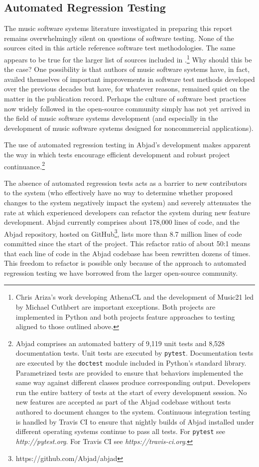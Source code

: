 \documentclass{article}
\begin{document}
\subsection{Automated Regression Testing}

The music software systems literature investigated in preparing this report
remains overwhelmingly silent on questions of software testing. None of the
sources cited in this article reference software test methodologies. The same
appears to be true for the larger list of sources included in
\cite{trevino2013compositional}.\footnote{Chris Ariza's work developing
AthenaCL \cite{Ariza2005} and the development of Music21 \cite{Ariza2010} led
by Michael Cuthbert are important exceptions. Both projects are implemented in
Python and both projects feature approaches to testing aligned to those
outlined above.} Why should this be the case? One possibility is that authors
of music software systems have, in fact, availed themselves of important
improvements in software test methods developed over the previous decades but
have, for whatever reasons, remained quiet on the matter in the publication
record. Perhaps the culture of software best practices now widely followed in the open-source community simply has not yet arrived in the field of music software systems development (and especially in the development of music software systems designed for noncommercial
applications).

The use of automated regression testing in Abjad's development makes apparent
the way in which tests encourage efficient development and robust project
continuance.\footnote{Abjad comprises an automated battery of 9,119 unit tests
and 8,528 documentation tests. Unit tests are executed by \texttt{pytest}.
Documentation tests are executed by the \texttt{doctest} module included in
Python's standard library. Parametrized tests are provided to ensure that
behaviors implemented the same way against different classes produce
corresponding output. Developers run the entire battery of tests at the start
of every development session. No new features are accepted as part of the Abjad
codebase without tests authored to document changes to the system. Continuous
integration testing is handled by Travis CI to ensure that nightly builds of
Abjad installed under different operating systems continue to pass all tests.
For \texttt{pytest} see \textit{http://pytest.org}. For Travis CI see
\textit{https://travis-ci.org}.}

The absence of automated regression tests acts as a barrier to new contributors
to the system (who effectively have no way to determine whether proposed
changes to the system negatively impact the system) and severely attenuates the
rate at which experienced developers can refactor the system during new feature
development. Abjad currently comprises about 178,000 lines of code, and the
Abjad repository, hosted on GitHub\footnote{https://github.com/Abjad/abjad},
lists more than 8.7 million lines of code committed since the start of the
project. This refactor ratio of about 50:1 means that each line of code in the
Abjad codebase has been rewritten dozens of times. This freedom to refactor is
possible only because of the approach to automated regression testing we have
borrowed from the larger open-source community.
\end{document}
